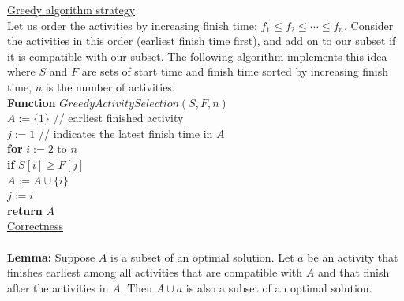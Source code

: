 \documentclass[11pt]{article}
\begin{document}
\underline{Greedy algorithm strategy}\\

Let us order the activities by increasing finish time: $f_1 \leq f_2
\leq \cdots \leq f_n$. Consider the activities in this order (earliest
finish time first), and add on to our subset if it is compatible with
our subset. The following algorithm implements this idea where $S$ and
$F$ are sets of start time and finish time sorted by increasing finish
time, $n$ is the number of activities.\\

\textbf{Function} $GreedyActivitySelection(S, F, n)$\\
\-\hspace{3em} $A := \{1\}$ // earliest finished activity\\
\-\hspace{3em} $j := 1$ // indicates the latest finish time in $A$\\
\-\hspace{3em} \textbf{for} $i := 2$ to $n$ \\
\-\hspace{5em} \textbf{if} $S[i] \geq F[j]$ \\
\-\hspace{7em} $A := A \cup \{i\}$ \\
\-\hspace{7em} $j := i$ \\
\-\hspace{3em} \textbf{return} $A$ \\

\underline{Correctness}\\\\
\textbf{Lemma:} Suppose $A$ is a subset of an optimal solution. Let
$a$ be an activity that finishes earliest among all activities that
are compatible with $A$ and that finish after the activities in
$A$. Then $A \cup {a}$ is also a subset of an optimal solution.
\end{document}
